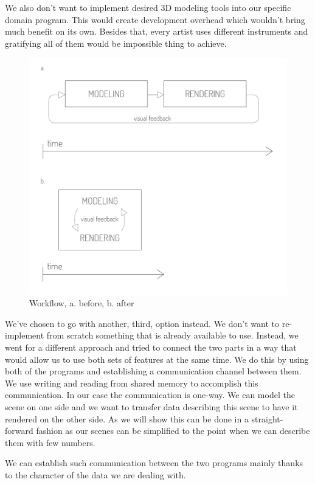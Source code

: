 \documentclass[
  digital, %
  table,   %
  nolof,     %
  nolot,     %
]{fithesis3}
\begin{document}
We also don't want to implement desired 3D modeling tools into our specific domain program. This would create development overhead which wouldn't bring much benefit on its own. Besides that, every artist uses different instruments and gratifying all of them would be impossible thing to achieve.

\begin{figure}
  \centering
  \includegraphics[scale=0.7]{images/workflow-before-after.pdf}
  \caption{Workflow, a. before, b. after}
  \label{fig:workflow}
\end{figure}

We've chosen to go with another, third, option instead. We don't want to re-implement from scratch something that is already available to use. Instead, we went for a different approach and tried to connect the two parts in a way that would allow us to use both sets of features at the same time. We do this by using both of the programs and establishing a communication channel between them. We use writing and reading from shared memory to accomplish this communication. In our case the communication is one-way. We can model the scene on one side and we want to transfer data describing this scene to have it rendered on the other side. As we will show this can be done in a straight-forward fashion as our scenes can be simplified to the point when we can describe them with few numbers.

We can establish such communication between the two programs mainly thanks to the character of the data we are dealing with.
\end{document}
